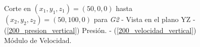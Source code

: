 \documentclass[10pt,a4paper,final]{article}
\begin{document}
\begin{figure}[H]
   \centering
   \hspace{0.1\linewidth}
    \caption{Corte en $(x_1,y_1,z_1)=(50,0,0)$ hasta $(x_2,y_2,z_2)=(50,100,0)$ para \emph{G2} - Vista en el plano YZ - (\ref{200_presion_vertical}) Presión. - (\ref{200_velocidad_vertical}) Módulo de Velocidad.}
   \label{200_velocidad_presion_vertical}                %
\end{figure}
\end{document}
